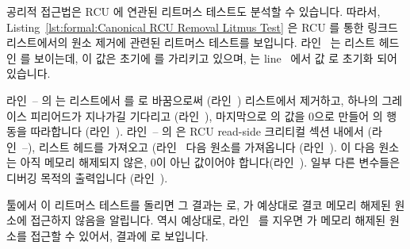 \begin{lineref}
공리적 접근법은 RCU 에 연관된 리트머스 테스트도 분석할 수 있습니다.
따라서,
Listing~\ref{lst:formal:Canonical RCU Removal Litmus Test}
은 RCU 를 통한 링크드 리스트에서의 원소 제거에 관련된 리트머스 테스트를
보입니다.
라인~ 는 리스트 헤드인  를 보이는데, 이 값은 초기에  를
가리키고 있으며, 는 line~ 에서 값  로 초기화 되어
있습니다.
\iffalse

Axiomatic approaches can also analyze litmus tests involving RCU.
To that end,
Listing~\ref{lst:formal:Canonical RCU Removal Litmus Test}
(\path{C-RCU-remove.litmus})
shows a litmus test corresponding to the canonical RCU-mediated
removal from a linked list.
Line~\lnref{head} shows \co{x} as the list head, initially
referencing \co{y}, which in turn is initialized to the value
\co{2} on line~\lnref{tail:1}.
\fi

	라인~-- 의  는 리스트에서  를 
로 바꿈으로써 (라인~) 리스트에서 제거하고, 하나의 그레이스
피리어드가 지나가길 기다리고 (라인~), 마지막으로  의 값을
0으로 만들어  의 행동을 따라합니다 (라인~).
라인~-- 의  은 RCU read-side 크리티컬 섹션
내에서 (라인~--), 리스트 헤드를 가져오고
(라인~ 다음 원소를 가져옵니다 (라인~).
이 다음 원소는 아직 메모리 해제되지 않은, 0이 아닌 값이어야
합니다(라인~).
일부 다른 변수들은 디버깅 목적의 출력입니다 (라인~).
\iffalse

\co{P0()} on lines~\lnref{P0start}--\lnref{P0end}
removes element \co{y} from the list by replacing it with element \co{z}
(line~\lnref{assignnewtail}),
waits for a grace period (line~\lnref{sync}),
and finally zeroes \co{y} to emulate \co{free()} (line~\lnref{free}).
\co{P1()} on lines~\lnref{P1start}--\lnref{P1end}
executes within an RCU read-side critical section
(lines~\lnref{rl}--\lnref{rul}),
picking up the list head (line~\lnref{rderef}) and then
loading the next element (line~\lnref{read}).
The next element should be non-zero, that is, not yet freed
(line~\lnref{exists_}).
Several other variables are output for debugging purposes
(line~\lnref{locations_}).
\fi

 툴에서 이 리트머스 테스트를 돌리면 그 결과는  로,  가 예상대로 결코 메모리 해제된 원소에 접근하지 않음을 알립니다.
역시 예상대로, 라인~ 를 지우면  가 메모리 해제된 원소를 접근할 수 있어서,  결과에  로 보입니다.
\iffalse

The output of the \co{herd} tool when running this litmus test features
\co{Never}, indicating that \co{P0()} never accesses a freed element,
as expected.
Also as expected, removing line~\lnref{sync} results in \co{P0()}
accessing a freed element, as indicated by the \co{Sometimes} in
the \co{herd} output.
\fi
\end{lineref}

